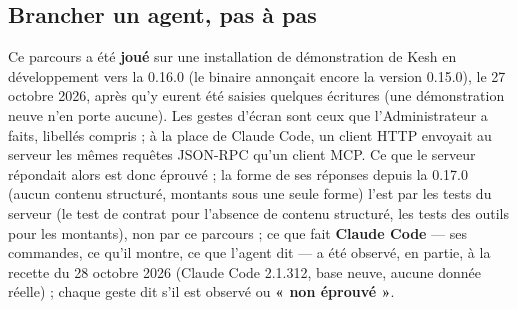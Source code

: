 \documentclass[a4paper,11pt,oneside]{article}
\begin{document}
\subsection{Brancher un agent, pas à pas}\label{sec:mcp-brancher}

Ce parcours a été \textbf{joué} sur une installation de démonstration de Kesh en développement vers la 0.16.0 (le binaire annonçait encore la version 0.15.0), le 27 octobre 2026, après qu'y eurent été saisies quelques écritures (une démonstration neuve n'en porte aucune). Les gestes d'écran sont ceux que l'Administrateur a faits, libellés compris ; à la place de Claude Code, un client HTTP envoyait au serveur les mêmes requêtes JSON-RPC qu'un client MCP. Ce que le serveur répondait alors est donc éprouvé ; la forme de ses réponses depuis la 0.17.0 (aucun contenu structuré, montants sous une seule forme) l'est par les tests du serveur (le test de contrat pour l'absence de contenu structuré, les tests des outils pour les montants), non par ce parcours ; ce que fait \textbf{Claude Code} --- ses commandes, ce qu'il montre, ce que l'agent dit --- a été observé, en partie, à la recette du 28 octobre 2026 (Claude Code 2.1.312, base neuve, aucune donnée réelle) ; chaque geste dit s'il est observé ou \textbf{« non éprouvé »}.
\end{document}
